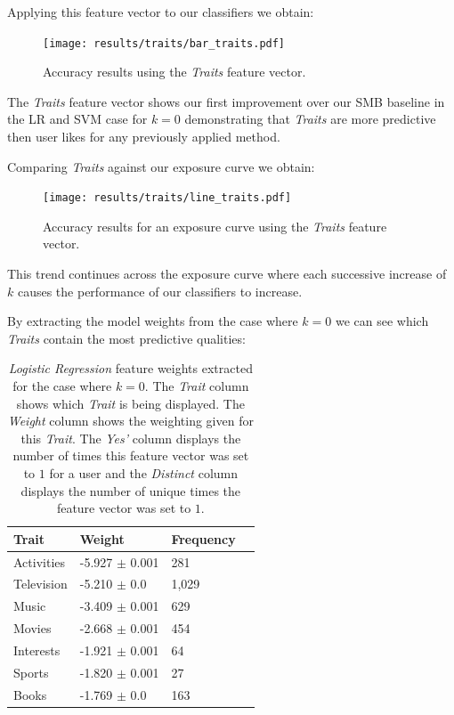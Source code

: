\clearpage

Applying this feature vector to our classifiers we obtain:

\begin{figure}[h]
	\begin{center}
		\texttt{[image: results/traits/bar\_traits.pdf]}
		\caption{Accuracy results using the \emph{Traits} feature vector.}
	\end{center}
\end{figure}

The \emph{Traits} feature vector shows our first improvement over our SMB baseline in the LR and SVM case for $k=0$ demonstrating that 
\emph{Traits} are more predictive then user likes for any previously applied method.

\clearpage

Comparing \emph{Traits} against our exposure curve we obtain:

\begin{figure}[h]
	\begin{center}
		\texttt{[image: results/traits/line\_traits.pdf]}
		\caption{Accuracy results for an exposure curve using the \emph{Traits} feature vector.}
	\end{center}
\end{figure}

This trend continues across the exposure curve where each successive increase of $k$ causes the performance of our classifiers to increase.

\clearpage

By extracting the model weights from the case where $k=0$ we can see which \emph{Traits} contain the most predictive qualities:

\begin{table}[h]
\begin{minipage}[b]{1.0\textwidth}
\centering
  \begin{tabular}{|l|l|l|l|} %
  \hline
  		\textbf{Trait} & \textbf{Weight} & \textbf{Frequency} \\ \hline
		Activities & -5.927 $\pm$ 0.001 & 281 \\ \hline
		Television & -5.210 $\pm$ 0.0 & 1,029 \\ \hline
		Music & -3.409 $\pm$ 0.001 & 629 \\ \hline
		Movies & -2.668 $\pm$ 0.001 & 454 \\ \hline
		Interests & -1.921 $\pm$ 0.001 & 64 \\ \hline
		Sports & -1.820 $\pm$ 0.001 & 27 \\ \hline		
		Books & -1.769 $\pm$ 0.0 & 163 \\ \hline		
  \end{tabular}
  \caption{\emph{Logistic Regression} feature weights extracted for the case where $k=0$. The \emph{Trait} column shows which \emph{Trait}
  is being displayed. The \emph{Weight} column shows the weighting given for this \emph{Trait}. The \emph{Yes'} column displays the number of times 
  this feature vector was set to $1$ for a user and the \emph{Distinct} column displays the number of unique times the feature vector 
  was set to $1$.}
\end{minipage}
\end{table}

